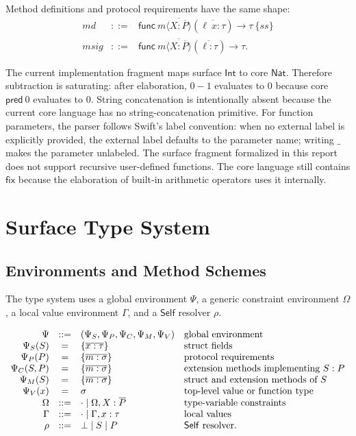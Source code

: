 \documentclass[manuscript,nonacm]{acmart}
\newcommand{\kw}[1]{\ensuremath{\mathsf{#1}}}
\newcommand{\Int}{\kw{Int}}
\newcommand{\Nat}{\kw{Nat}}
\newcommand{\Self}{\kw{Self}\xspace}
\newcommand{\emptyctx}{\cdot}
\begin{document}
Method definitions and protocol requirements have the same shape:
\[
\begin{array}{rcl}
md & ::= &
\kw{func}\ m\langle\overline{X : \overline{P}}\rangle
(\overline{\ell\ x : \tau}) \to \tau\ \{ ss \}
\\
msig & ::= &
\kw{func}\ m\langle\overline{X : \overline{P}}\rangle
(\overline{\ell : \tau}) \to \tau .
\end{array}
\]

The current implementation fragment maps surface $\Int$ to core $\Nat$.
Therefore subtraction is saturating: after elaboration, $0-1$ evaluates to $0$ because core $\kw{pred}\ 0$ evaluates to $0$.
String concatenation is intentionally absent because the current core language has no string-concatenation primitive.
For function parameters, the parser follows Swift's label convention: when no external label is explicitly provided, the external label defaults to the parameter name; writing $\_$ makes the parameter unlabeled.
The surface fragment formalized in this report does not support recursive user-defined functions.
The core language still contains $\kw{fix}$ because the elaboration of built-in arithmetic operators uses it internally.

\section{Surface Type System}

\subsection{Environments and Method Schemes}

The type system uses a global environment $\Psi$, a generic constraint environment $\Omega$, a local value environment $\Gamma$, and a \Self resolver $\rho$.

\[
\begin{array}{rcll}
\Psi & ::= & (\Psi_S,\Psi_P,\Psi_C,\Psi_M,\Psi_V)
  & \text{global environment} \\
\Psi_S(S) &=& \{\overline{x:\tau}\}
  & \text{struct fields} \\
\Psi_P(P) &=& \{\overline{m:\sigma}\}
  & \text{protocol requirements} \\
\Psi_C(S,P) &=& \{\overline{m:\sigma}\}
  & \text{extension methods implementing } S:P \\
\Psi_M(S) &=& \{\overline{m:\sigma}\}
  & \text{struct and extension methods of } S \\
\Psi_V(x) &=& \sigma
  & \text{top-level value or function type} \\
\Omega & ::= & \emptyctx \mid \Omega,X:\overline{P}
  & \text{type-variable constraints} \\
\Gamma & ::= & \emptyctx \mid \Gamma,x:\tau
  & \text{local values} \\
\rho & ::= & \bot \mid S \mid P
  & \text{\Self resolver.}
\end{array}
\]
\end{document}
